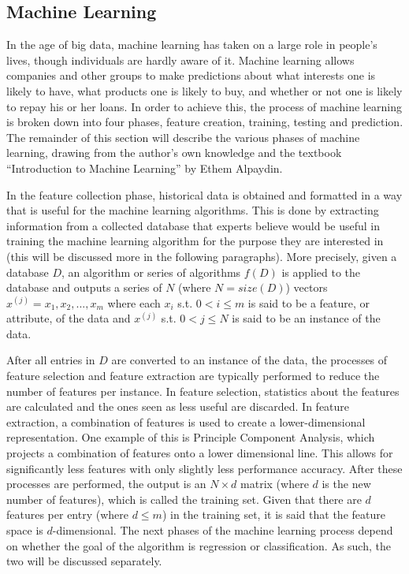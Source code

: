 \documentclass[12pt]{article} %
\begin{document}
\subsection{Machine Learning} \label{subsec:machinelearning}%
In the age of big data, machine learning has taken on a large role in people's lives, though individuals are hardly aware of it. Machine learning allows companies and other groups to make predictions about what interests one is likely to have, what products one is likely to buy, and whether or not one is likely to repay his or her loans. In order to achieve this, the process of machine learning is broken down into four phases, feature creation, training, testing and prediction. The remainder of this section will describe the various phases of machine learning, drawing from the author's own knowledge and the textbook ``Introduction to Machine Learning'' by Ethem Alpaydin. \cite{introduction}

In the feature collection phase, historical data is obtained and formatted in a way that is useful for the machine learning algorithms. This is done by extracting information from a collected database that experts believe would be useful in training the machine learning algorithm for the purpose they are interested in (this will be discussed more in the following paragraphs). More precisely, given a database $D$, an algorithm or series of algorithms $f(D)$ is applied to the database and outputs a series of $N$ (where $N = size(D)$) vectors $x^{(j)} = {x_1, x_2, ..., x_m}$ where each $x_i$ s.t. $0 < i \leq m$ is said to be a feature, or attribute, of the data and $x^{(j)}$ s.t. $0 < j \leq N$ is said to be an instance of the data. 

After all entries in $D$ are converted to an instance of the data, the processes of feature selection and feature extraction are typically performed to reduce the number of features per instance. In feature selection, statistics about the features are calculated and the ones seen as less useful are discarded. In feature extraction, a combination of features is used to create a lower-dimensional representation. One example of this is Principle Component Analysis, which projects a combination of features onto a lower dimensional line. This allows for significantly less features with only slightly less performance accuracy. After these processes are performed, the output is an $N \times d$ matrix (where $d$ is the new number of features), which is called the training set. Given that there are $d$ features per entry (where $d \leq m$) in the training set, it is said that the feature space is $d$-dimensional. The next phases of the machine learning process depend on whether the goal of the algorithm is regression or classification. As such, the two will be discussed separately.
\end{document}
